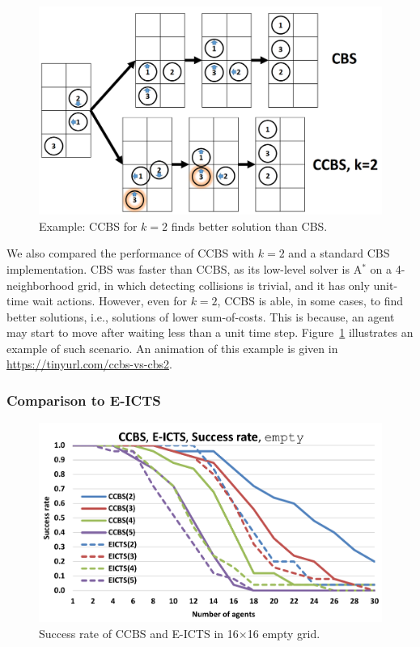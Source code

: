 \documentclass[review]{elsarticle}
\newcommand\konstantin[1]{\nb{\textbf{Konstantin:}}{red}{#1}}
\newcommand\roni[1]{\nb{\textbf{Roni:}}{green}{#1}}
\newcommand{\ccbs}{\ac{CCBS}\xspace}
\newcommand{\cbs}{\ac{CBS}\xspace}
\newcommand{\astar}{A$^*$\xspace}
\begin{document}



\begin{figure}
    \centering
    \includegraphics[width=0.7\columnwidth]{anton-example.PNG}
    \caption{Example: \ccbs for $k=2$ finds better solution than \cbs.}
    \label{fig:anton-example}
\end{figure}

We also compared the performance of \ccbs with $k=2$ and a standard \cbs implementation. 
\cbs was faster than \ccbs, as its low-level solver is \astar on a 4-neighborhood grid, in which detecting collisions is trivial, and it has only unit-time wait actions. However, even for $k=2$, \ccbs is able, in some cases, to find better solutions, i.e., solutions of lower sum-of-costs. This is because, an agent may start to move after waiting less than a unit time step. 
Figure~\ref{fig:anton-example} illustrates an example of such scenario. An animation of this example is given in \url{https://tinyurl.com/ccbs-vs-cbs2}. %




\subsubsection{Comparison to E-ICTS}


\begin{figure}
    \centering
    \includegraphics[width=0.75\columnwidth]{ccbs-eicts-sr-plot-empty_NEW.pdf}
    \caption{Success rate of \ccbs and E-ICTS in 16$\times$16 empty grid.}
    \label{fig:ccbs-vs-eicts}
    \vspace{-0.3cm}
\end{figure}
\end{document}
